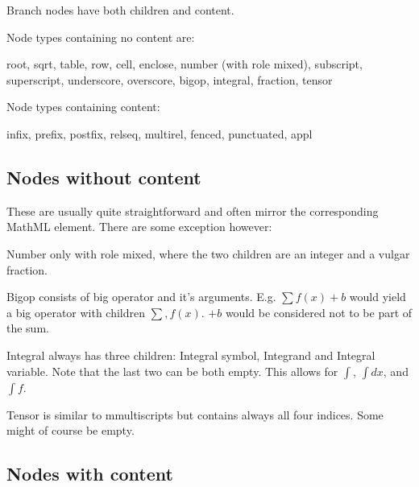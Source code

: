 \documentclass{article}
\begin{document}
Branch nodes have both children and content. 

Node types containing no content are: 

root, sqrt, table, row, cell, enclose, number (with role mixed), subscript,
superscript, underscore, overscore, bigop, integral, fraction, tensor

Node types containing content: 

infix, prefix, postfix, relseq, multirel, fenced, punctuated, appl

\subsection{Nodes without content}

These are usually quite straightforward and often mirror the corresponding
MathML element. There are some exception however: 

Number only with role mixed, where the two children are an integer and a vulgar
fraction.

Bigop consists of big operator and it's arguments. E.g. $\sum f(x) + b$ would
yield a big operator with children $\sum, f(x)$. $+ b$ would be considered not
to be part of the sum.

Integral always has three children: Integral symbol, Integrand and Integral
variable. Note that the last two can be both empty. This allows for $\int$,
$\int dx$, and $\int f$.

Tensor is similar to mmultiscripts but contains always all four indices.  Some
might of course be empty.

\subsection{Nodes with content}
\end{document}
